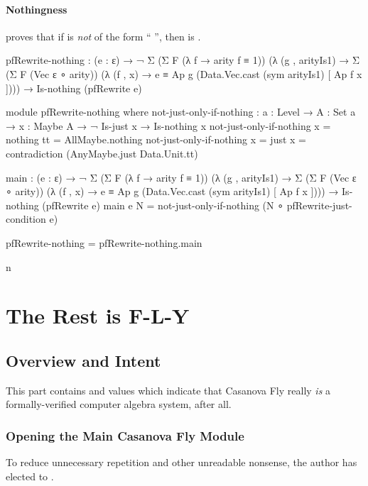\documentclass{report}
\begin{document}
\subsection{ Nothingness}
 proves that if  is \emph{not} of the form ``  \AgdaInductiveConstructor{[}    \AgdaInductiveConstructor{]}'', then   is .

\begin{code}
    pfRewrite-nothing :
      (e : ε) →
      ¬ Σ (Σ F (λ f → arity f ≡ 1))
          (λ (g , arityIs1) →
             Σ (Σ F (Vec ε ∘ arity))
               (λ (f , x) →
                  e ≡ Ap g (Data.Vec.cast (sym arityIs1) [ Ap f x ]))) →
      Is-nothing (pfRewrite e)

    module pfRewrite-nothing where
      not-just-only-if-nothing :
        {a : Level} →
        {A : Set a} →
        {x : Maybe A} →
        ¬ Is-just x →
        Is-nothing x
      not-just-only-if-nothing {x = nothing} tt = AllMaybe.nothing
      not-just-only-if-nothing {x = just x} =
        contradiction (AnyMaybe.just Data.Unit.tt)

      main :
        (e : ε) →
        ¬ Σ (Σ F (λ f → arity f ≡ 1))
            (λ (g , arityIs1) →
               Σ (Σ F (Vec ε ∘ arity))
                 (λ (f , x) →
                    e ≡ Ap g (Data.Vec.cast (sym arityIs1) [ Ap f x ]))) →
        Is-nothing (pfRewrite e)
      main e N = not-just-only-if-nothing (N ∘ pfRewrite-just-condition e)

    pfRewrite-nothing = pfRewrite-nothing.main
\end{code}
n
\part{The Rest is F-L-Y}

\chapter{Overview and Intent}
This part contains  and  values which indicate that Casanova Fly really \emph{is} a formally-verified computer algebra system, after all.

\section{Opening the Main Casanova Fly Module}
To reduce unnecessary repetition and other unreadable nonsense, the author has elected to  .
\end{document}
